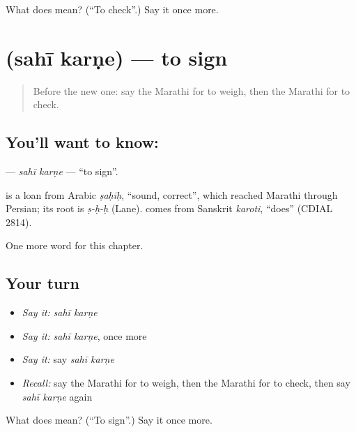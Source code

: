 \begin{tcolorbox}[breakable,colback=teal!4,colframe=teal!35!black,title={Before you move on}]
What does  mean? (\textquotedblleft{}To check\textquotedblright{}.) Say it once more.
\end{tcolorbox}
\section[\texorpdfstring{\mr{सही} \mr{करणे} (sahī karṇe)}{सही करणे (sahī karṇe)}]{  (sahī karṇe) — to sign}

\label{lesson:MR-C163-sahi-karne}



\begin{quote}
Before the new one: say the Marathi for to weigh, then the Marathi for to check.
\end{quote}

\subsection*{You'll want to know:  }
\textbf{ } — \emph{sahī karṇe} — \textquotedblleft{}to sign\textquotedblright{}.

\begin{cousinweb}
\textbf{} is a loan from Arabic \emph{ṣaḥīḥ}, \textquotedblleft{}sound, correct\textquotedblright{}, which reached Marathi through Persian; its root is \emph{ṣ-ḥ-ḥ} (Lane). \textbf{} comes from Sanskrit \emph{karoti}, \textquotedblleft{}does\textquotedblright{} (CDIAL 2814).
\end{cousinweb}

\begin{grammarlens}[title={What you've built}]
One more word for this chapter.
\end{grammarlens}

\subsection*{Your turn}
\begin{itemize}
\raggedright
  \item \emph{Say it:} \emph{sahī karṇe}
  \item \emph{Say it:} \emph{sahī karṇe}, once more
  \item \emph{Say it:} say \emph{sahī karṇe}
  \item \emph{Recall:} say the Marathi for to weigh, then the Marathi for to check, then say \emph{sahī karṇe} again
\end{itemize}

\begin{tcolorbox}[breakable,colback=teal!4,colframe=teal!35!black,title={Before you move on}]
What does   mean? (\textquotedblleft{}To sign\textquotedblright{}.) Say it once more.
\end{tcolorbox}
